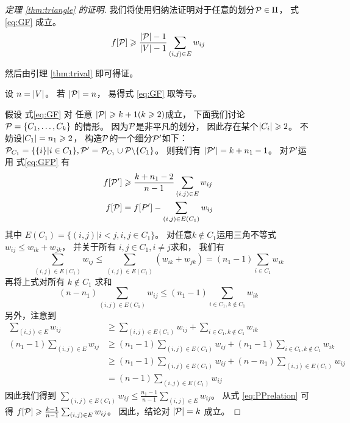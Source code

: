   \begin{proof}[定理 \ref{thm:triangle} 的证明]
    我们将使用归纳法证明对于任意的划分$\P \in \Pi$，
    式\eqref{eq:GF} 成立。
    \begin{equation}\label{eq:GF}
    f[\P] \geq \frac{\abs{\P}-1}{\abs{V}-1} \sum_{(i,j) \in E} w_{ij}
    \end{equation}
    
    然后由引理 \ref{thm:trival} 
    即可得证。
    
    设 $n=\abs{V}$。
    若 $\abs{\P}=n$，
    易得式 \eqref{eq:GF} 取等号。
    
    假设 式\eqref{eq:GF} 对 任意
    $\abs{\P} \geq k+1(k\geq 2)$成立，
    下面我们讨论 $\P=\{C_1, \dots, C_k\}$
    的情形。
    因为$\P$是非平凡的划分，
    因此存在某个$\abs{C_i}\geq 2$。
    不妨设$\abs{C_1}=n_1\geq 2$，
    构造$\P$的一个细分$\P'$如下：
    $\P_{C_1} = \{\{i\}| i \in C_1\}, \P'=\P_{C_1} \cup \P \backslash \{C_1\}$。
    则我们有 $\abs{\P'} = k+n_1-1$。
    对$\P'$运用 式\eqref{eq:GFP} 有
    \begin{align}\label{eq:PPrelation}
    f[\P'] &
    \geq \frac{k+n_1 -2}{n-1}\sum_{(i,j) \in E} w_{ij} \\
    f[\P] & =f[P'] - \sum_{(i,j) \in E(C_1)} w_{ij}
    \end{align}
    其中
    $E(C_1) =\{ (i,j) |i<j, i, j\in C_1 \}$。
    对任意$k \not\in C_1$运用三角不等式
    $w_{ij} \leq w_{ik} + w_{jk}$，
    并关于所有 $i, j \in C_1, i\neq j$求和，
    我们有
    $$
    \sum_{(i,j) \in E(C_1)} w_{ij} \leq \sum_{(i,j) \in E(C_1)} (w_{ik} + w_{jk}) = (n_1-1)\sum_{i\in C_1} w_{ik}
    $$
    再将上式对所有 $k \not\in C_1$ 求和
    $$
    (n - n_1) \sum_{(i,j) \in E(C_1)} w_{ij} \leq (n_1 - 1) \sum_{i \in C_1, k \not\in C_1} w_{ik}
    $$
    另外，注意到
    \begin{align*}
    \sum_{(i,j) \in E} w_{ij}  & \geq \sum_{(i,j) \in E(C_1)} w_{ij} + \sum_{i\in C_1, k\not\in C_1} w_{ik} \\
    (n_1 - 1)\sum_{(i,j) \in E} w_{ij}  & \geq (n_1 -1 )\sum_{(i,j) \in E(C_1)} w_{ij} + (n_1-1)\sum_{i\in C_1, k\not\in C_1} w_{ik} \\
    & \geq (n_1 -1 )\sum_{(i,j) \in E(C_1)} w_{ij} + (n - n_1) \sum_{(i,j) \in E(C_1)} w_{ij}\\
    & = (n-1) \sum_{(i,j) \in E(C_1)} w_{ij}
    \end{align*}
   因此我们得到 $\sum_{(i,j) \in E(C_1)} w_{ij} \leq \frac{n_1-1}{n-1}\sum_{(i,j) \in E} w_{ij}$。
   从式 \eqref{eq:PPrelation} 可得
    $f[\P] \geq \frac{k-1}{n-1}\sum_{(i,j) \in E} w_{ij}$。
    因此，结论对 $\abs{\P}=k$ 成立。
    \end{proof}
